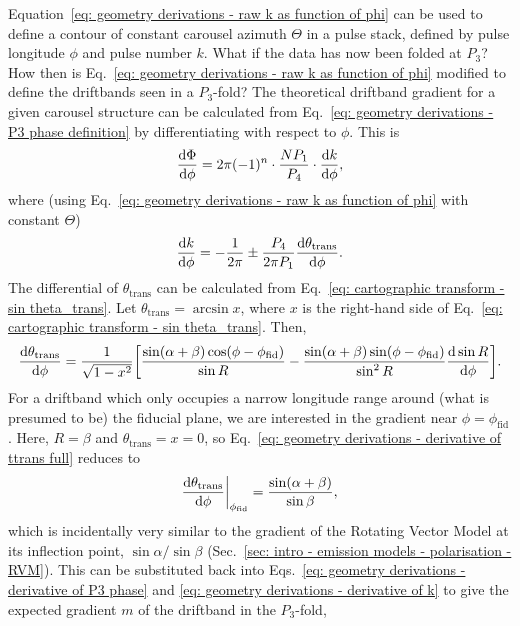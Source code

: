 Equation~\eqref{eq: geometry derivations - raw k as function of phi} can be used to define a contour of constant carousel azimuth $\Theta$ in a pulse stack, defined by pulse longitude $\phi$ and pulse number $k$. What if the data has now been folded at $P_3$? How then is Eq.~\eqref{eq: geometry derivations - raw k as function of phi} modified to define the driftbands seen in a $P_3$-fold? The theoretical driftband gradient for a given carousel structure can be calculated from Eq.~\eqref{eq: geometry derivations - P3 phase definition} by differentiating with respect to $\phi$. This is
\begin{equation}
    \label{eq: geometry derivations - derivative of P3 phase}
    \frac{\mathrm{d}\Phi}{\mathrm{d}\phi} = 2\pi(-1)^n\cdot \frac{NP_1}{P_4} \cdot \frac{\mathrm{d}k}{\mathrm{d}\phi},
\end{equation}
where (using Eq.~\eqref{eq: geometry derivations - raw k as function of phi} with constant $\Theta$)
\begin{equation}
    \frac{\mathrm{d}k}{\mathrm{d}\phi} = -\frac{1}{2\pi}\pm\frac{P_4}{2\pi P_1}\frac{\mathrm{d}\theta_\mathrm{trans}}{\mathrm{d}\phi}.
    \label{eq: geometry derivations - derivative of k}
\end{equation}
The differential of $\theta_\mathrm{trans}$ can be calculated from Eq.~\eqref{eq: cartographic transform - sin theta_trans}. Let $\theta_\mathrm{trans} = \arcsin{x}$, where $x$ is the right-hand side of Eq.~\eqref{eq: cartographic transform - sin theta_trans}. Then, 
\begin{equation}
    \label{eq: geometry derivations - derivative of ttrans full}
    \frac{\mathrm{d}\theta_\mathrm{trans}}{\mathrm{d}\phi} = \frac{1}{\sqrt{1-x^2}} \bigg[\frac{\sin(\alpha + \beta) \cos(\phi-\phi_\mathrm{fid})}{\sin R} - \frac{\sin(\alpha + \beta) \sin(\phi-\phi_\mathrm{fid})}{\sin^2 R} \frac{\mathrm{d}\sin R}{\mathrm{d}\phi}\bigg].
\end{equation}
For a driftband which only occupies a narrow longitude range around (what is presumed to be) the fiducial plane, we are interested in the gradient near $\phi = \phi_\mathrm{fid}$. Here, $R=\beta$ and $\theta_\mathrm{trans}= x = 0$, so Eq.~\eqref{eq: geometry derivations - derivative of ttrans full} reduces to
\begin{equation}
    \label{eq: geometry derivations - derivative of ttrans phifid}
    \frac{\mathrm{d}\theta_\mathrm{trans}}{\mathrm{d}\phi}\bigg|_{\phi_\mathrm{fid}} = \frac{\sin(\alpha + \beta)}{\sin\beta},
\end{equation}
which is incidentally very similar to the gradient of the Rotating Vector Model at its inflection point, $\sin\alpha / \sin\beta$ (Sec.~\ref{sec: intro - emission models - polarisation - RVM}). This can be substituted back into Eqs.~\eqref{eq: geometry derivations - derivative of P3 phase} and \eqref{eq: geometry derivations - derivative of k} to give the expected gradient $m$ of the driftband in the $P_3$-fold,
